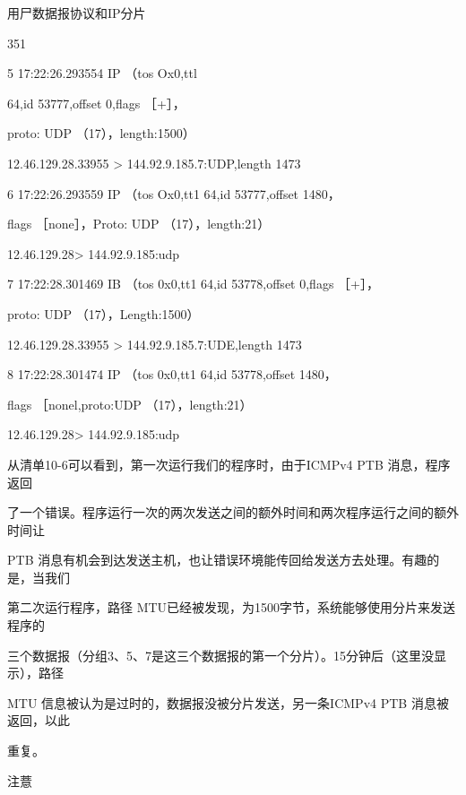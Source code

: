 用尸数据报协议和IP分片

351

5 17:22:26.293554 IP （tos Ox0,ttl

64,id 53777,offset 0,flags ［+］，

proto: UDP （17），length:1500）

12.46.129.28.33955 > 144.92.9.185.7:UDP,length 1473

6 17:22:26.293559 IP （tos Ox0,tt1 64,id 53777,offset 1480，

flags ［none］，Proto: UDP （17），length:21）

12.46.129.28> 144.92.9.185:udp

7 17:22:28.301469 IB （tos 0x0,tt1 64,id 53778,offset 0,flags ［+］，

proto: UDP （17），Length:1500）

12.46.129.28.33955 > 144.92.9.185.7:UDE,length 1473

8 17:22:28.301474 IP （tos 0x0,tt1 64,id 53778,offset 1480，

flags ［nonel,proto:UDP （17），length:21）

12.46.129.28> 144.92.9.185:udp

从清单10-6可以看到，第一次运行我们的程序时，由于ICMPv4 PTB 消息，程序返回

了一个错误。程序运行一次的两次发送之间的额外时间和两次程序运行之间的额外时间让

PTB 消息有机会到达发送主机，也让错误环境能传回给发送方去处理。有趣的是，当我们

第二次运行程序，路径 MTU已经被发现，为1500字节，系统能够使用分片来发送程序的

三个数据报（分组3、5、7是这三个数据报的第一个分片）。15分钟后（这里没显示），路径

MTU 信息被认为是过时的，数据报没被分片发送，另一条ICMPv4 PTB 消息被返回，以此

重复。

注薏

\iffalse
\begin{tcolorbox}
\href{https://www.rfc-editor.org/rfc/rfc1191}{[RFC1191]}推荐一个由PMTUD得到的PMTU 值在10分钟后过时。路
径MTU 发现有时会因为防火墙和网关过滤可能不加选择地丢弃ICMP 流量而
出现问题，这会损害 PMTU 发现算法。因为这点，从基于系统范畴或有更好保
证来看，可能要关闭PMTU发现。在Linux 中，文件/proc/sys/net/ipv4/ip\_no\_
Pmtu\_disc 可以置成1以关闭PMTU发现。在 Windows 中，可以编辑注册表入口
\verb|HKEY_LOCAL_MACHINE\System CurrentControl Set Services Topip Parameters
EnablePMTUDiscovery| 的值0。一个不使用ICMP 的、传统 PMTUD 的替代品已
经被开发出来\href{https://www.rfc-editor.org/rfc/rfc4821}{[RFC4821]}，我们将在第15 章介绍它。
\end{tcolorbox}
\fi

